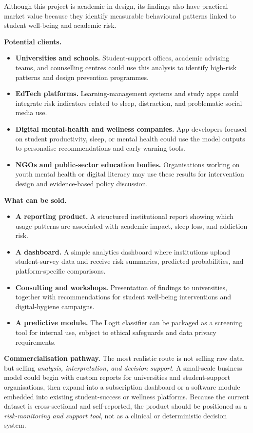 \documentclass[10pt]{article}
\begin{document}
Although this project is academic in design, its findings also have practical
market value because they identify measurable behavioural patterns linked to
student well-being and academic risk.

\textbf{Potential clients.}
\begin{itemize}
  \item \textbf{Universities and schools.} Student-support offices, academic
        advising teams, and counselling centres could use this analysis to
        identify high-risk patterns and design prevention programmes.
  \item \textbf{EdTech platforms.} Learning-management systems and study apps
        could integrate risk indicators related to sleep, distraction, and
        problematic social media use.
  \item \textbf{Digital mental-health and wellness companies.} App developers
        focused on student productivity, sleep, or mental health could use the
        model outputs to personalise recommendations and early-warning tools.
  \item \textbf{NGOs and public-sector education bodies.} Organisations working
        on youth mental health or digital literacy may use these results for
        intervention design and evidence-based policy discussion.
\end{itemize}

\textbf{What can be sold.}
\begin{itemize}
  \item \textbf{A reporting product.} A structured institutional report showing
        which usage patterns are associated with academic impact, sleep loss,
        and addiction risk.
  \item \textbf{A dashboard.} A simple analytics dashboard where institutions
        upload student-survey data and receive risk summaries, predicted
        probabilities, and platform-specific comparisons.
  \item \textbf{Consulting and workshops.} Presentation of findings to
        universities, together with recommendations for student well-being
        interventions and digital-hygiene campaigns.
  \item \textbf{A predictive module.} The Logit classifier can be packaged as a
        screening tool for internal use, subject to ethical safeguards and data
        privacy requirements.
\end{itemize}

\textbf{Commercialisation pathway.} The most realistic route is not selling raw
data, but selling \textit{analysis, interpretation, and decision support}. A
small-scale business model could begin with custom reports for universities and
student-support organisations, then expand into a subscription dashboard or a
software module embedded into existing student-success or wellness platforms.
Because the current dataset is cross-sectional and self-reported, the product
should be positioned as a \textit{risk-monitoring and support tool}, not as a
clinical or deterministic decision system.
\end{document}
